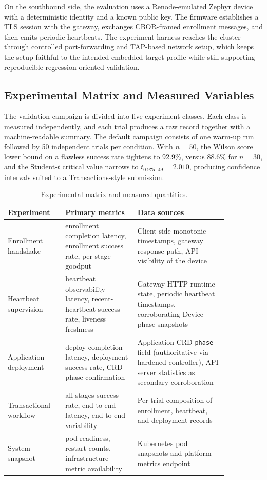 On the southbound side, the evaluation uses a Renode-emulated Zephyr device with a deterministic identity and a known public key. The firmware establishes a TLS session with the gateway, exchanges CBOR-framed enrollment messages, and then emits periodic heartbeats. The experiment harness reaches the cluster through controlled port-forwarding and TAP-based network setup, which keeps the setup faithful to the intended embedded target profile while still supporting reproducible regression-oriented validation.

\subsection{Experimental Matrix and Measured Variables}
The validation campaign is divided into five experiment classes. Each class is measured independently, and each trial produces a raw record together with a machine-readable summary. The default campaign consists of one warm-up run followed by 50 independent trials per condition. With $n=50$, the Wilson score lower bound on a flawless success rate tightens to 92.9\%, versus 88.6\% for $n=30$, and the Student-$t$ critical value narrows to $t_{0.975,\,49}=2.010$, producing confidence intervals suited to a Transactions-style submission.

\begin{table}[h]
\centering
\caption{Experimental matrix and measured quantities.}
\label{tab:experiment-matrix}
\begin{tabular}{p{0.21\linewidth} p{0.29\linewidth} p{0.35\linewidth}}
\toprule
\textbf{Experiment} & \textbf{Primary metrics} & \textbf{Data sources} \\
\midrule
Enrollment handshake & enrollment completion latency, enrollment success rate, per-stage goodput & Client-side monotonic timestamps, gateway response path, API visibility of the device \\
Heartbeat supervision & heartbeat observability latency, recent-heartbeat success rate, liveness freshness & Gateway HTTP runtime state, periodic heartbeat timestamps, corroborating Device phase snapshots \\
Application deployment & deploy completion latency, deployment success rate, CRD phase confirmation & Application CRD \texttt{phase} field (authoritative via hardened controller), API server statistics as secondary corroboration \\
Transactional workflow & all-stages success rate, end-to-end latency, end-to-end variability & Per-trial composition of enrollment, heartbeat, and deployment records \\
System snapshot & pod readiness, restart counts, infrastructure metric availability & Kubernetes pod snapshots and platform metrics endpoint \\
\bottomrule
\end{tabular}
\end{table}

